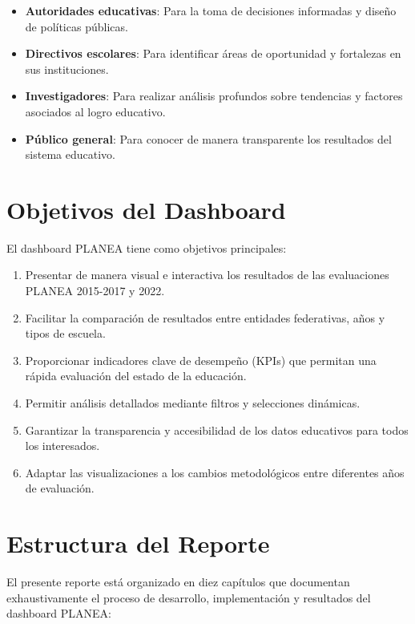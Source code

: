 \begin{itemize}
    \item \textbf{Autoridades educativas}: Para la toma de decisiones informadas y diseño de políticas públicas.
    \item \textbf{Directivos escolares}: Para identificar áreas de oportunidad y fortalezas en sus instituciones.
    \item \textbf{Investigadores}: Para realizar análisis profundos sobre tendencias y factores asociados al logro educativo.
    \item \textbf{Público general}: Para conocer de manera transparente los resultados del sistema educativo.
\end{itemize}

\section{Objetivos del Dashboard}
El dashboard PLANEA tiene como objetivos principales:

\begin{enumerate}
    \item Presentar de manera visual e interactiva los resultados de las evaluaciones PLANEA 2015-2017 y 2022.
    \item Facilitar la comparación de resultados entre entidades federativas, años y tipos de escuela.
    \item Proporcionar indicadores clave de desempeño (KPIs) que permitan una rápida evaluación del estado de la educación.
    \item Permitir análisis detallados mediante filtros y selecciones dinámicas.
    \item Garantizar la transparencia y accesibilidad de los datos educativos para todos los interesados.
    \item Adaptar las visualizaciones a los cambios metodológicos entre diferentes años de evaluación.
\end{enumerate}

\section{Estructura del Reporte}
El presente reporte está organizado en diez capítulos que documentan exhaustivamente el proceso de desarrollo, implementación y resultados del dashboard PLANEA:

